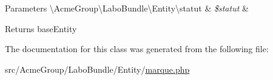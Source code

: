 \begin{DoxyParams}[1]{Parameters}
\textbackslash{}\+Acme\+Group\textbackslash{}\+Labo\+Bundle\textbackslash{}\+Entity\textbackslash{}statut & {\em \$statut} & \\
\hline
\end{DoxyParams}
\begin{DoxyReturn}{Returns}
base\+Entity 
\end{DoxyReturn}


The documentation for this class was generated from the following file\+:\begin{DoxyCompactItemize}
\item 
src/\+Acme\+Group/\+Labo\+Bundle/\+Entity/\hyperlink{marque_8php}{marque.\+php}\end{DoxyCompactItemize}
